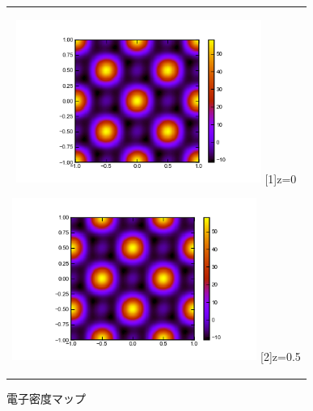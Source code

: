 \documentclass[a4paper,12pt]{jarticle}
\begin{document}
     \begin{figure}[htbp]
      \begin{center}
       \begin{tabular}{c}
       
       \begin{minipage}{0.5\hsize}
        \begin{center}
         \includegraphics[clip,width=8cm]{Al_im00.png}
         \label{fig:Al_im00}
         \hspace{1.6cm} [1]z=0
        \end{center}
       \end{minipage}
       
       \begin{minipage}{0.5\hsize}
        \begin{center}
         \includegraphics[clip,width=8cm]{Al_im05.png}
         \label{fig:Al_im05}
         \hspace{1.6cm} [2]z=0.5
        \end{center}
       \end{minipage}
       
      \end{tabular} 
      \caption{電子密度マップ}
      \label{fig:Al_im}
      \end{center}
     \end{figure}  
     
\end{document}
